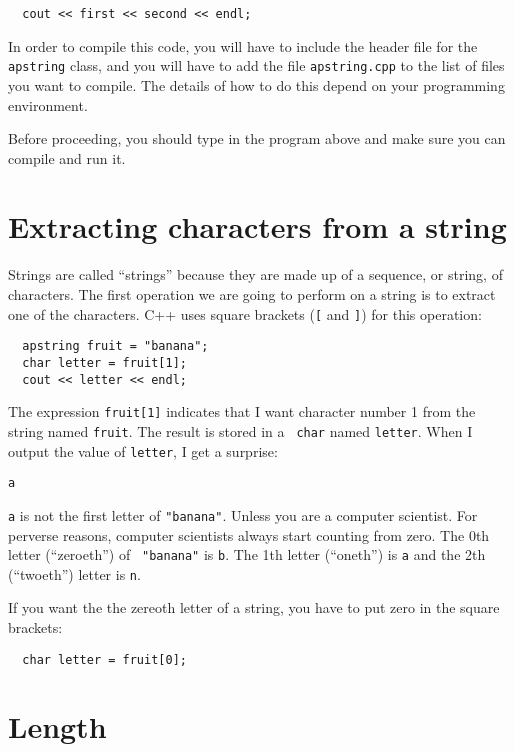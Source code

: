 \begin{verbatim}
  cout << first << second << endl;
\end{verbatim}
%

In order to compile this code, you will have to include the
header file for the {\tt apstring} class, and you will have
to add the file {\tt apstring.cpp} to the list of files you
want to compile.  The details of how to do this depend on your
programming environment.

Before proceeding, you should type in the program above and make
sure you can compile and run it.

\section{Extracting characters from a string}

Strings are called ``strings'' because they are made up of a sequence,
or string, of characters.  The first operation we are going to
perform on a string is to extract one of the characters.  C++
uses square brackets ({\tt [} and {\tt ]}) for this operation:

\begin{verbatim}
  apstring fruit = "banana";
  char letter = fruit[1];
  cout << letter << endl;
\end{verbatim}
%
The expression {\tt fruit[1]} indicates that I want character number 1
from the string named {\tt fruit}.  The result is stored in a {\tt
char} named {\tt letter}.  When I output the value of {\tt letter}, I
get a surprise:

\begin{verbatim}
a
\end{verbatim}
%
{\tt a} is not the first letter of {\tt "banana"}.  Unless you are a
computer scientist.  For perverse reasons, computer scientists always
start counting from zero.  The 0th letter (``zeroeth'') of {\tt
"banana"} is {\tt b}.  The 1th letter (``oneth'') is {\tt a} and the
2th (``twoeth'') letter is {\tt n}.

If you want the the zereoth letter of a string, you have to put
zero in the square brackets:

\begin{verbatim}
  char letter = fruit[0];
\end{verbatim}

\section{Length}

